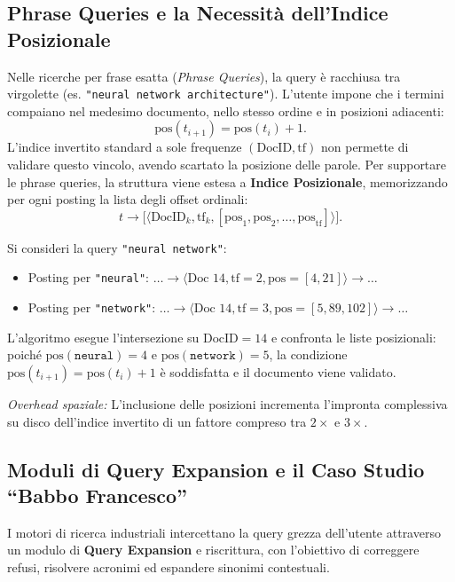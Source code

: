 \FloatBarrier
\subsection{Phrase Queries e la Necessit\`a dell'Indice Posizionale}
\label{subsec:phrase-queries-indice-posizionale}
Nelle ricerche per frase esatta (\textit{Phrase Queries}), la query \`e racchiusa tra virgolette (es. \texttt{"neural network architecture"}). L'utente impone che i termini compaiano nel medesimo documento, nello stesso ordine e in posizioni adiacenti:
\begin{equation}
\text{pos}(t_{i+1}) = \text{pos}(t_i) + 1.
\end{equation}
L'indice invertito standard a sole frequenze $(\text{DocID}, \text{tf})$ non permette di validare questo vincolo, avendo scartato la posizione delle parole. Per supportare le phrase queries, la struttura viene estesa a \textbf{Indice Posizionale}, memorizzando per ogni posting la lista degli offset ordinali:
\begin{equation}
t \longrightarrow \big[ \langle \text{DocID}_k, \text{tf}_k, [\text{pos}_1, \text{pos}_2, \dots, \text{pos}_{\text{tf}}] \rangle \big].
\end{equation}

\begin{example}
Si consideri la query \texttt{"neural network"}:
\begin{itemize}
    \item Posting per \texttt{"neural"}: $\dots \to \langle \text{Doc } 14, \text{tf}=2, \text{pos}=[4, 21] \rangle \to \dots$
    \item Posting per \texttt{"network"}: $\dots \to \langle \text{Doc } 14, \text{tf}=3, \text{pos}=[5, 89, 102] \rangle \to \dots$
\end{itemize}
L'algoritmo esegue l'intersezione su $\text{DocID} = 14$ e confronta le liste posizionali: poich\'e $\text{pos}(\texttt{neural}) = 4$ e $\text{pos}(\texttt{network}) = 5$, la condizione $\text{pos}(t_{i+1}) = \text{pos}(t_i) + 1$ \`e soddisfatta e il documento viene validato.
\end{example}
\textit{Overhead spaziale:} L'inclusione delle posizioni incrementa l'impronta complessiva su disco dell'indice invertito di un fattore compreso tra $2\times$ e $3\times$.

\FloatBarrier
\subsection{Moduli di Query Expansion e il Caso Studio ``Babbo Francesco''}
\label{subsec:query-expansion-babbo-francesco}
I motori di ricerca industriali intercettano la query grezza dell'utente attraverso un modulo di \textbf{Query Expansion} e riscrittura, con l'obiettivo di correggere refusi, risolvere acronimi ed espandere sinonimi contestuali. 

